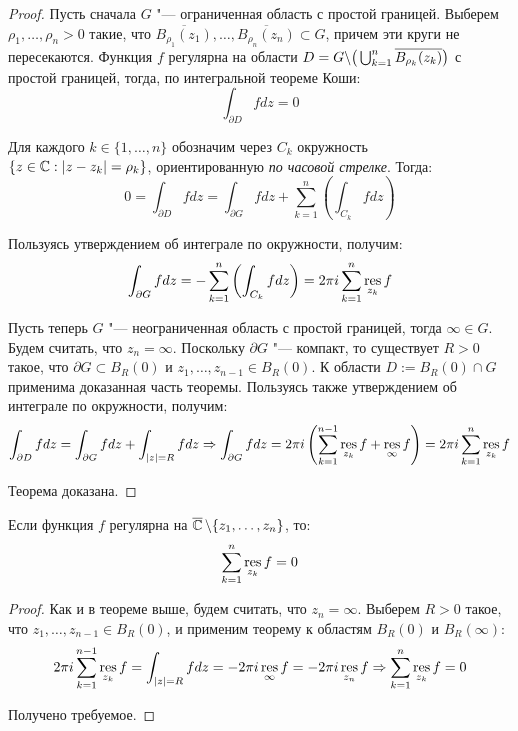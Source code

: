 \begin{proof}
	Пусть сначала $G$ "--- ограниченная область с простой границей. Выберем $\rho_1, \dotsc, \rho_n > 0$ такие, что $\overline{B_{\rho_1}(z_1)}, \dotsc, \overline{B_{\rho_n}(z_n)} \subset G$, причем эти круги не пересекаются. Функция $f$ регулярна на области $D = G \backslash \big(\bigcup_{k = 1}^n\overline{B_{\rho_k}(z_k)}\big)$ с простой границей, тогда, по интегральной теореме Коши:
	\[\int_{\partial D} fdz = 0\]
	
	Для каждого $k \in \{1, \dotsc, n\}$ обозначим через $C_k$ окружность $\{z \in \mathbb{C}: |z - z_k| = \rho_k\}$, ориентированную \textit{по часовой стрелке}. Тогда:
	\[0 = \int_{\partial D} fdz = \int_{\partial G} fdz + \sum_{k = 1}^n\left(\int_{C_k}fdz\right)\]
	
	Пользуясь утверждением об интеграле по окружности, получим:
	\[\int_{\partial G} fdz = -\sum_{k = 1}^n\left(\int_{C_k}fdz\right) = 2 \pi i\sum_{k = 1}^n\operatorname*{res}_{z_k}f\]
	
	Пусть теперь $G$ "--- неограниченная область с простой границей, тогда $\infty \in G$. Будем считать, что $z_n = \infty$. Поскольку $\partial G$ "--- компакт, то существует $R > 0$ такое, что $\partial G \subset B_R(0)$ и $z_1, \dotsc, z_{n-1} \in B_R(0)$. К области $D := B_R(0) \cap G$ применима доказанная часть теоремы. Пользуясь также утверждением об интеграле по окружности, получим:
	\[\int_{\partial D} fdz = \int_{\partial G}fdz + \int_{|z| = R}fdz \Rightarrow \int_{\partial G}fdz = 2\pi i\left(\sum_{k = 1}^{n-1}\operatorname*{res}_{z_k}f + \operatorname*{res}_{\infty}f\right) = 2\pi i\sum_{k = 1}^{n}\operatorname*{res}_{z_k}f\]

	Теорема доказана.
\end{proof}

\begin{corollary}
	Если функция $f$ регулярна на $\overline{\mathbb{C}}\,\backslash \{z_1, \dotsc, z_n\}$, то:
	\[\sum_{k = 1}^n\operatorname*{res}_{z_k}f = 0\]
\end{corollary}

\begin{proof}
	Как и в теореме выше, будем считать, что $z_n = \infty$. Выберем $R > 0$ такое, что $z_1, \dotsc, z_{n-1} \in B_R(0)$, и применим теорему к областям $B_R(0)$ и ${B_R(\infty)}$:
	\[2\pi i\sum_{k = 1}^{n-1}\operatorname*{res}_{z_k}f = \int_{|z| = R}fdz = -2\pi i\operatorname*{res}_{\infty}f = -2\pi i\operatorname*{res}_{z_n}f \Rightarrow \sum_{k = 1}^n\operatorname*{res}_{z_k}f = 0\]
	
	Получено требуемое.
\end{proof}

